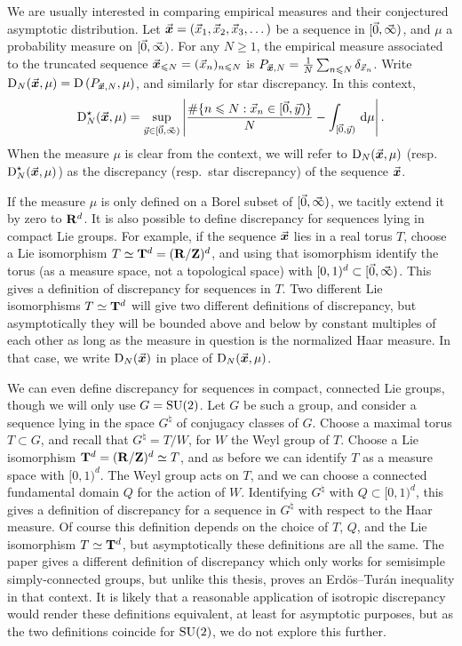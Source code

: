 We are usually interested in comparing empirical measures and their conjectured 
asymptotic distribution. 
Let $\vec{\boldsymbol x} = (\vec{x}_1,\vec{x}_2,\vec{x}_3,\dots)$ be a sequence in 
$[\vec{0},\vec{\infty})$, and $\mu$ a probability measure on $[\vec{0},\vec{\infty})$. For any 
$N\geqslant 1$, the empirical measure associated to the truncated 
sequence $\vec{\boldsymbol x}_{\leqslant N} = (\vec{x}_n)_{n\leqslant N}$ is 
$P_{\vec{\boldsymbol x},N} = \frac{1}{N} \sum_{n\leqslant N} \delta_{\vec{x}_n}$. Write 
$\operatorname{D}_N(\vec{\boldsymbol x},\mu) = \operatorname{D}\left( P_{\vec{\boldsymbol x},N},\mu\right)$, and similarly for star 
discrepancy. In this context, 
\[
	\operatorname{D}^\star_N(\vec{\boldsymbol x},\mu) = \sup_{\vec{y}\in [\vec{0},\vec{\infty})} \left| \frac{\# \{n\leqslant N : \vec{x}_n \in [\vec{0},\vec{y})\}}{N} - \int_{[\vec{0},\vec{y})} \, \mathrm{d}\mu\right| .
\]
When the measure $\mu$ is clear from the context, we will refer to 
$\operatorname{D}_N(\vec{\boldsymbol x},\mu)$ (resp.~$\operatorname{D}_N^\star(\vec{\boldsymbol x},\mu)$) as the discrepancy (resp.~star 
discrepancy) of the sequence $\vec{\boldsymbol x}$.

If the measure $\mu$ is only defined on a Borel subset of $[\vec{0},\vec{\infty})$, we 
tacitly extend it by zero to $\mathbf{R}^d$. It is also possible to define discrepancy 
for sequences lying in compact Lie groups. For example, if the sequence $\vec{\boldsymbol x}$ 
lies in a real torus $T$, choose a Lie isomorphism $T\simeq \mathbf{T}^d = (\mathbf{R}/\mathbf{Z})^d$, 
and using that isomorphism identify the torus (as a measure space, not a 
topological space) with 
$[0,1)^d\subset [\vec{0},\vec{\infty})$. 
This gives a definition of discrepancy for sequences in $T$. Two different 
Lie isomorphisms $T\simeq \mathbf{T}^d$ will give two different definitions of 
discrepancy, but asymptotically they will be bounded above and below by 
constant multiples of each other as long as the measure in question is the 
normalized Haar measure. In that case, we write $\operatorname{D}_N(\vec{\boldsymbol x})$ in place of 
$\operatorname{D}_N(\vec{\boldsymbol x}, \mu)$. 

We can even define discrepancy for sequences in compact, connected Lie groups, 
though we will only use $G = \operatorname{SU}(2)$. Let $G$ be such a group, and consider a 
sequence lying in the space $G^\natural$ of conjugacy classes of $G$. Choose a 
maximal torus $T\subset G$, and recall that 
$G^\natural = T/W$, for $W$ the Weyl group of $T$. Choose a Lie isomorphism 
$\mathbf{T}^d = (\mathbf{R}/\mathbf{Z})^d \simeq T$, and as before we can identify $T$ as a measure 
space with 
$[0,1)^d$. The Weyl group acts on $T$, and we can choose a connected fundamental 
domain $Q$ for the action of $W$. Identifying 
$G^\natural$ with $Q\subset [0,1)^d$, this gives a definition of discrepancy for 
a sequence in $G^\natural$ with respect to the Haar measure. Of course this 
definition depends on the choice of $T$, $Q$, and the Lie isomorphism 
$T\simeq \mathbf{T}^d$, but 
asymptotically these definitions are all the same. The paper 
\cite{rosengarten-2013} gives a different definition of discrepancy which only 
works for semisimple simply-connected groups, but unlike this thesis, proves an 
Erd\"os--Tur\'an inequality in that context. It is likely that a reasonable 
application of isotropic discrepancy would render these definitions equivalent, 
at least for asymptotic purposes, but as the two definitions coincide for 
$\operatorname{SU}(2)$, we do not explore this further. 

